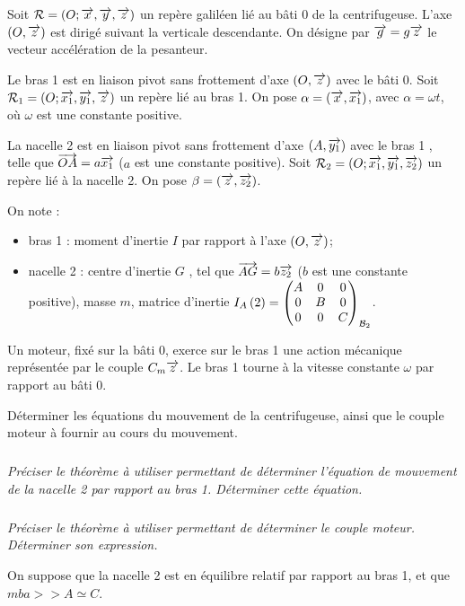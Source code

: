 \documentclass[10pt,fleqn]{article} %
\begin{document}
\begin{multicols}{2}
Soit $\mathcal{R}=\repere{O}{x}{y}{z}$ un repère galiléen lié au bâti 0 de la centrifugeuse. L'axe $\axe{O}{z}$ est dirigé suivant la verticale descendante. 
On désigne par $\vect{g}=g\vect{z}$ le vecteur accélération de la pesanteur.

Le bras 1 est en liaison pivot sans frottement d’axe $\axe{O}{z}$ avec le bâti 0. Soit $\mathcal{R}_1=\repere{O}{x_1}{y_1}{z}$ un repère lié au bras 1. On pose $\alpha=\angl{x}{x_1}$, avec $\alpha=\omega t$, où $\omega$ est une constante positive. 

La nacelle 2 est en liaison pivot sans frottement d’axe $\axe{A}{y_1}$ avec le bras 1 , telle que $\vect{OA}=a\vect{x_1}$ ($a$ est une constante positive). Soit $\mathcal{R}_2=\repere{O}{x_1}{y_1}{z_2}$ un repère lié à la nacelle 2. On pose $\beta=\angl{z}{z_2}$. 

On note :
\begin{itemize}
\item bras 1 : moment d’inertie $I$ par rapport à l’axe $\axe{O}{z}$;
\item nacelle 2 : centre d’inertie $G$ , tel que $\vect{AG}=b\vect{z_2}$ ($b$ est une constante positive), masse $m$, 
matrice d’inertie $\inertie{A}{2}=\matinertie{A}{B}{C}{0}{0}{0}{\mathcal{B}_2}$. 
\end{itemize}
Un moteur, fixé sur la bâti 0, exerce sur le bras 1 une action mécanique représentée par le couple $C_m\vect{z}$.
Le bras 1 tourne à la vitesse constante $\omega$ par rapport au bâti 0.

\begin{obj}
Déterminer les équations du mouvement de la centrifugeuse, ainsi que le couple moteur à fournir au cours du
mouvement.
\end{obj}

\subparagraph{}
\textit{Préciser le théorème à utiliser permettant de déterminer l’équation de mouvement de la nacelle 2 par rapport au
bras 1. Déterminer cette équation.}
\ifprof
\begin{corrige}
\end{corrige}
\else
\fi

\subparagraph{}
\textit{Préciser le théorème à utiliser permettant de déterminer le couple moteur. Déterminer son expression.}
\ifprof
\begin{corrige}
\end{corrige}
\else
\fi

On suppose que la nacelle 2 est en équilibre relatif par rapport au bras 1, et que $mba> > A \simeq C$.


\end{multicols}
\end{document}
